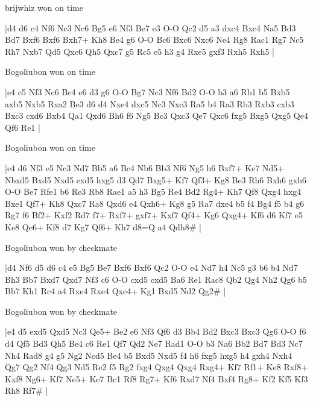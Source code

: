 \showboard

brijwhiz won on time

\makegametitle
|d4 d6 c4 Nf6 Nc3 Nc6 Bg5 e6 Nf3 Be7 e3 O-O Qc2 d5 a3 dxc4 Bxc4 Na5 Bd3 Bd7 Bxf6 Bxf6 Bxh7+ Kh8 Be4 g6 O-O Bc6 Bxc6 Nxc6 Ne4 Rg8 Rac1 Rg7 Nc5 Rh7 Nxb7 Qd5 Qxc6 Qh5 Qxc7 g5 Rc5 e5 h3 g4 Rxe5 gxf3 Rxh5 Rxh5  |

\showboard

Bogoliubon won on time

\makegametitle
|e4 c5 Nf3 Nc6 Bc4 e6 d3 g6 O-O Bg7 Nc3 Nf6 Bd2 O-O b3 a6 Rb1 b5 Bxb5 axb5 Nxb5 Rxa2 Be3 d6 d4 Nxe4 dxc5 Nc3 Nxc3 Ra5 b4 Ra3 Rb3 Rxb3 cxb3 Bxc3 cxd6 Bxb4 Qa1 Qxd6 Bh6 f6 Ng5 Bc3 Qxc3 Qe7 Qxc6 fxg5 Bxg5 Qxg5 Qe4 Qf6 Re1  |

\showboard

Bogoliubon won on time

\makegametitle
|e4 d6 Nf3 e5 Nc3 Nd7 Bb5 a6 Bc4 Nb6 Bb3 Nf6 Ng5 h6 Bxf7+ Ke7 Nd5+ Nbxd5 Bxd5 Nxd5 exd5 hxg5 d3 Qd7 Bxg5+ Kf7 Qf3+ Kg8 Be3 Rh6 Bxh6 gxh6 O-O Be7 Rfe1 b6 Re3 Rb8 Rae1 a5 h3 Bg5 Re4 Bd2 Rg4+ Kh7 Qf8 Qxg4 hxg4 Bxe1 Qf7+ Kh8 Qxc7 Ra8 Qxd6 e4 Qxh6+ Kg8 g5 Ra7 dxe4 b5 f4 Bg4 f5 b4 g6 Rg7 f6 Bf2+ Kxf2 Rd7 f7+ Rxf7+ gxf7+ Kxf7 Qf4+ Kg6 Qxg4+ Kf6 d6 Kf7 e5 Ke8 Qe6+ Kf8 d7 Kg7 Qf6+ Kh7 d8=Q a4 Qdh8\#  |

\showboard

Bogoliubon won by checkmate

\makegametitle
|d4 Nf6 d5 d6 c4 e5 Bg5 Be7 Bxf6 Bxf6 Qc2 O-O e4 Nd7 h4 Nc5 g3 b6 b4 Nd7 Bh3 Bb7 Bxd7 Qxd7 Nf3 c6 O-O cxd5 cxd5 Ba6 Re1 Rac8 Qb2 Qg4 Nh2 Qg6 b5 Bb7 Kh1 Rc4 a4 Rxe4 Rxe4 Qxe4+ Kg1 Bxd5 Nd2 Qg2\#  |

\showboard

Bogoliubon won by checkmate

\makegametitle
|e4 d5 exd5 Qxd5 Nc3 Qe5+ Be2 e6 Nf3 Qf6 d3 Bb4 Bd2 Bxc3 Bxc3 Qg6 O-O f6 d4 Qf5 Bd3 Qh5 Be4 c6 Re1 Qf7 Qd2 Ne7 Rad1 O-O b3 Na6 Bb2 Bd7 Bd3 Nc7 Nh4 Rad8 g4 g5 Ng2 Ncd5 Be4 b5 Bxd5 Nxd5 f4 h6 fxg5 hxg5 h4 gxh4 Nxh4 Qg7 Qg2 Nf4 Qg3 Nd5 Re2 f5 Rg2 fxg4 Qxg4 Qxg4 Rxg4+ Kf7 Rf1+ Ke8 Rxf8+ Kxf8 Ng6+ Kf7 Ne5+ Ke7 Bc1 Rf8 Rg7+ Kf6 Rxd7 Nf4 Bxf4 Rg8+ Kf2 Kf5 Kf3 Rh8 Rf7\#  |

